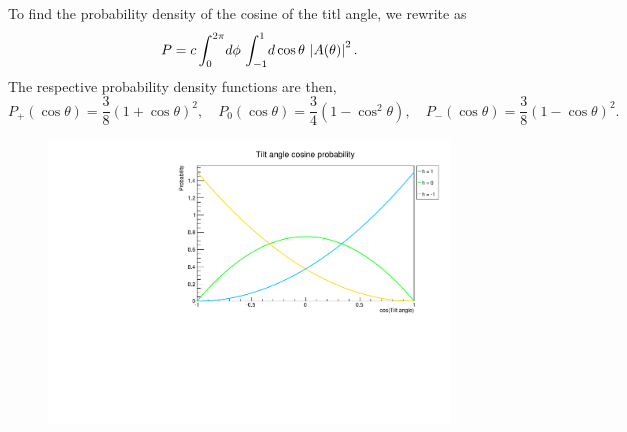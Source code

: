 \documentclass[12pt]{article}
\begin{document}
To find the probability density of the cosine of the titl angle, we rewrite
 as
\begin{equation}\label{eq:cos_prob}
  P = c\int_0^{2\pi}\! d\phi\, \int_{-1}^1\! d\cos\theta\, \left|A(\theta)\right|^2.
\end{equation}
The respective probability density functions are then,
\begin{equation}
  P_+(\cos\theta) = \frac{3}{8}(1+\cos\theta)^2, \quad
  P_0(\cos\theta) = \frac{3}{4}(1-\cos^2\theta), \quad
  P_-(\cos\theta) = \frac{3}{8}(1-\cos\theta)^2.
\end{equation}

\vspace{-3mm}
\begin{figure}[H]
  \centering
  \includegraphics[width=0.95\textwidth]{fig/tilt_angle_cos_prob.pdf}
\end{figure}
\end{document}
